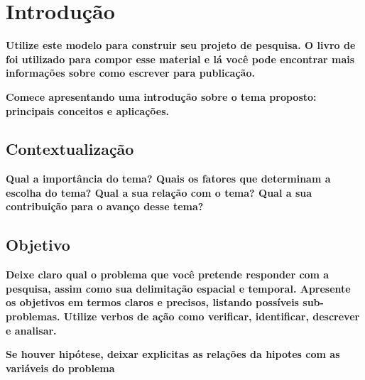 \chapter{Introdução}
\textbf{Utilize este modelo para construir seu projeto de pesquisa. O livro de \textcite{jalongo2016writing} foi utilizado para compor esse material e lá você pode encontrar mais informações sobre como escrever para publicação.}

\textbf{Comece apresentando uma introdução sobre o tema proposto: principais conceitos e aplicações.}

\lipsum[1-1]

\section{Contextualização}
\textbf{Qual a importância do tema? Quais os fatores que determinam a escolha do tema? Qual a sua relação com o tema? Qual a sua contribuição para o avanço desse tema?}

\lipsum[1-2]

\section{Objetivo}

\textbf{Deixe claro qual o problema que você pretende responder com a pesquisa, assim como sua delimitação espacial e temporal. Apresente os objetivos em termos claros e precisos, listando possíveis sub-problemas. Utilize verbos de ação como verificar, identificar, descrever e analisar.}

\textbf{Se houver hipótese, deixar explicitas as relações da hipotes com as variáveis do problema}

\lipsum[1-2]
